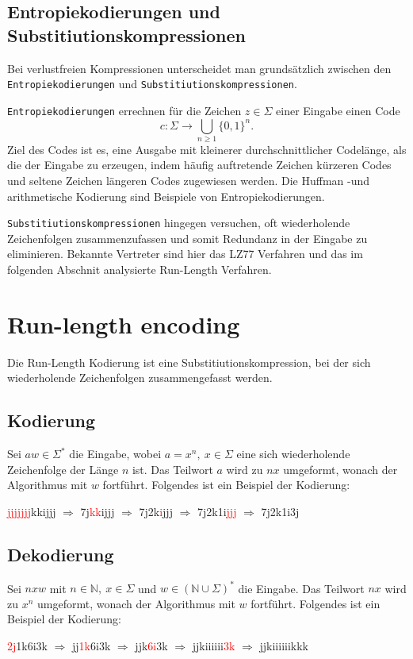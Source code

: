 \documentclass{article}
\newcommand{\R}{\Rightarrow}
\newcommand{\bb}[1]{\mathbb{{#1}}}
\newcommand{\red}{\textcolor{red}}
\newcommand{\para}{\par\null\par}
\begin{document}
\subsection{Entropiekodierungen und Substitiutionskompressionen}
Bei verlustfreien Kompressionen unterscheidet man grundsätzlich zwischen den
\texttt{Entropiekodierungen} und \texttt{Substitiutionskompressionen}.
\para
\texttt{Entropiekodierungen} errechnen für die Zeichen $z \in \Sigma$ einer Eingabe einen Code 
\[c: \Sigma \to \bigcup\limits_{n\geq1} \{0,1\}^n.\]
Ziel des Codes ist es, eine Ausgabe mit kleinerer durchschnittlicher Codel\"ange, 
als die der Eingabe zu erzeugen, indem häufig auftretende Zeichen 
kürzeren Codes und seltene Zeichen längeren Codes zugewiesen werden.
Die Huffman -und arithmetische Kodierung sind Beispiele von Entropiekodierungen.
\para
\texttt{Substitiutionskompressionen} hingegen versuchen, oft wiederholende Zeichenfolgen 
zusammenzufassen und somit Redundanz in der Eingabe zu eliminieren. Bekannte Vertreter
sind hier das LZ77 Verfahren und das im folgenden Abschnit analysierte Run-Length Verfahren.
\newpage
\section{Run-length encoding} 
Die Run-Length Kodierung ist eine Substitiutionskompression, bei der sich wiederholende
Zeichenfolgen zusammengefasst werden.
\subsection{Kodierung}
Sei $aw \in \Sigma^*$ die Eingabe, wobei $a = x^n,~x\in \Sigma$ eine
sich wiederholende Zeichenfolge der Länge $n$ ist. Das Teilwort $a$ wird zu $nx$ umgeformt, 
wonach der Algorithmus mit $w$ fortführt. Folgendes ist ein Beispiel der Kodierung:
\begin{center}
    \red{jjjjjjj}kkijjj $\R$ 7j\red{kk}ijjj $\R$ 7j2k\red{i}jjj $\R$ 7j2k1i\red{jjj} $\R$ 7j2k1i3j
\end{center}
\subsection{Dekodierung}
Sei $nxw$ mit $n\in \bb{N},~x\in\Sigma$ und $w\in(\bb{N}\cup\Sigma)^*$ die Eingabe. Das Teilwort $nx$ wird
zu $x^n$ umgeformt, wonach der Algorithmus mit $w$ fortführt. Folgendes ist ein Beispiel der Kodierung:
\begin{center}
    \red{2j}1k6i3k $\R$ jj\red{1k}6i3k $\R$ jjk\red{6i}3k $\R$ jjkiiiiii\red{3k} $\R$ jjkiiiiiikkk
\end{center}
\newpage
\end{document}
